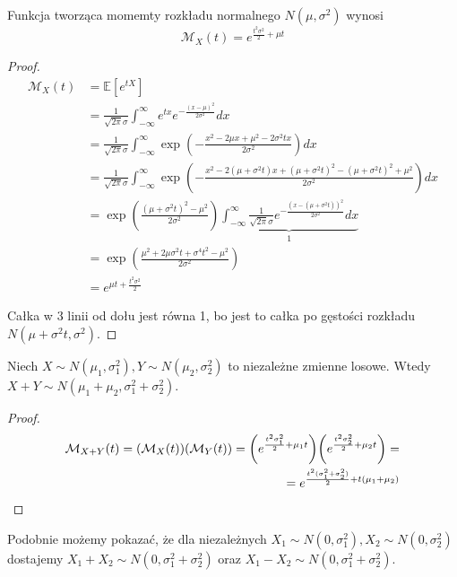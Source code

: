 \begin{theorem}
	Funkcja tworząca momemty rozkładu normalnego \(N(\mu, \sigma^2)\) wynosi
	\[
		\mathcal{M}_X(t) = e^{\frac{t^2\sigma^2}{2}+\mu t}
	\]
\end{theorem}
\begin{proof}
	\begin{align*}
		\mathcal{M}_X(t) & = \mathbb{E}[e^{tX}]                                                                                                                                                                          \\
		                 & = \frac{1}{\sqrt{2\pi}\sigma}\int_{-\infty}^{\infty} e^{tx} e^{-\frac{(x-\mu)^2}{2\sigma^2}} dx                                                                                               \\
		                 & = \frac{1}{\sqrt{2\pi}\sigma}\int_{-\infty}^{\infty} \exp\left( -\frac{x^2 - 2\mu x + \mu^2 - 2\sigma^2 tx}{2\sigma^2} \right) dx                                                             \\
		                 & = \frac{1}{\sqrt{2\pi}\sigma}\int_{-\infty}^{\infty} \exp\left( -\frac{x^2 - 2(\mu + \sigma^2 t)x + (\mu + \sigma^2 t)^2 - (\mu + \sigma^2 t)^2 + \mu^2}{2\sigma^2} \right) dx                \\
		                 & = \exp\left( \frac{(\mu + \sigma^2 t)^2 - \mu^2}{2\sigma^2} \right) \underbrace{\int_{-\infty}^{\infty} \frac{1}{\sqrt{2\pi}\sigma} e^{-\frac{(x - (\mu + \sigma^2 t))^2}{2\sigma^2}} dx}_{1} \\
		                 & = \exp\left( \frac{\mu^2 + 2\mu\sigma^2 t + \sigma^4 t^2 - \mu^2}{2\sigma^2} \right)                                                                                                          \\
		                 & = e^{\mu t + \frac{t^2\sigma^2}{2}}
	\end{align*}

	Całka w 3 linii od dołu jest równa 1, bo jest to całka po gęstości rozkładu \(N(\mu + \sigma^2 t, \sigma^2)\).
\end{proof}

\begin{theorem}
	Niech \(X \sim N(\mu_1, \sigma^2_1), Y \sim N(\mu_2, \sigma^2_2)\) to niezależne zmienne losowe. Wtedy \(X+Y \sim N(\mu_1+\mu_2, \sigma_1^2+\sigma_2^2)\).
\end{theorem}
\begin{proof}
	\begin{align*}
		\mathcal{M}_{X+Y}(t) = \pars{\mathcal{M}_X(t)}\pars{\mathcal{M}_Y(t)} = \pars{e^{\frac{t^2\sigma_1^2}{2}+\mu_1 t}}\pars{e^{\frac{t^2\sigma_2^2}{2}+\mu_2 t}} = \\
		= e^{\frac{t^2(\sigma_1^2+\sigma_2^2)}{2} + t(\mu_1 + \mu_2)}
	\end{align*}
\end{proof}

Podobnie możemy pokazać, że dla niezależnych \(X_1 \sim N(0, \sigma_1^2), X_2 \sim N(0, \sigma_2^2)\) dostajemy \(X_1+X_2 \sim N(0, \sigma_1^2+\sigma_2^2)\) oraz \(X_1-X_2 \sim N(0, \sigma_1^2+\sigma_2^2)\).

